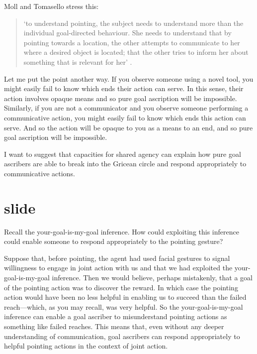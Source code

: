 \documentclass[12pt,\papersize]{extarticle}
\begin{document}
Moll and Tomasello stress this:
\begin{quote}
`to understand pointing, the subject needs to understand more than the individual goal-directed behaviour. 
She needs to understand that by pointing towards a location, the other attempts to communicate to her where a desired object is located; that the other tries to inform her about something that is relevant for her'
\citep[p.\ 6]{Moll:2007gu}.
\end{quote}
%
Let me put the point another way.
If you observe someone using a novel tool, you might easily fail to know which ends their action can serve.
In this sense, their action involves opaque means and so pure goal ascription will be impossible.
Similarly, if you are not a communicator and you observe someone performing a communicative action,
you might easily fail to know which ends this action can serve.
And so the action will be opaque to you as a means to an end, and so pure goal ascription will be impossible.


I want to suggest that capacities for shared agency can explain how pure goal ascribers are able to break into the Gricean circle and respond appropriately to communicative actions.



\section{slide}
Recall the your-goal-is-my-goal inference.
How could exploiting this inference could enable someone to respond appropriately to the pointing gesture?

Suppose 
that, 
before pointing, the agent had used facial gestures to signal willingness to engage in joint action with us
and 
that we had exploited the your-goal-is-my-goal inference.
Then we would believe,
perhaps mistakenly,
that a goal of the pointing action was to discover the reward.
In which case the pointing action would have been no less helpful in enabling us to succeed than the failed reach---which, as you may recall, was very helpful.
So the your-goal-is-my-goal inference can 
enable a goal ascriber
to  
misunderstand pointing actions as something like  failed reaches.
This means that,
even without any deeper understanding of communication,
goal ascribers can respond appropriately to helpful pointing actions in the context of joint action.
\end{document}
